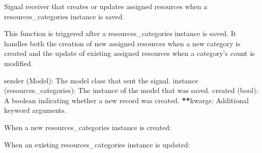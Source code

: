 \documentclass[letterpaper,10pt,english]{sphinxmanual}
\begin{document}
\begin{fulllineitems}
\label{\detokenize{app:app.signals.create_assigned_resources}}
\pysigstartsignatures
{}
\pysigstopsignatures
\sphinxAtStartPar
Signal receiver that creates or updates assigned resources when a resources\_categories instance is saved.

\sphinxAtStartPar
This function is triggered after a resources\_categories instance is saved. It handles 
both the creation of new assigned resources when a new category is created and the 
update of existing assigned resources when a category’s count is modified.
\begin{description}
\sphinxAtStartPar
sender (Model): The model class that sent the signal.
instance (resources\_categories): The instance of the model that was saved.
created (bool): A boolean indicating whether a new record was created.
{\color{red}\bfseries{}**}kwargs: Additional keyword arguments.

\sphinxAtStartPar
When a new resources\_categories instance is created:

\begin{sphinxVerbatim}[commandchars=\\\{\}]
   
\end{sphinxVerbatim}

\sphinxAtStartPar
When an existing resources\_categories instance is updated:

\begin{sphinxVerbatim}[commandchars=\\\{\}]
  
  
\end{sphinxVerbatim}


\end{description}
\end{fulllineitems}
\end{document}
